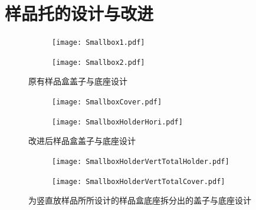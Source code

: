             \section{样品托的设计与改进} %
            \label{sec:样品托的设计与改进}



\begin{figure}[h]
  \centering%
  \begin{subfigure}{0.4\textwidth}
    \texttt{[image: Smallbox1.pdf]}
  \end{subfigure}%
  \begin{subfigure}{0.4\textwidth}
    \texttt{[image: Smallbox2.pdf]}
  \end{subfigure}
  \caption{原有样品盒盖子与底座设计}
  \label{fig:oldSampleBox}
\end{figure}
                  












\begin{figure}[h]
  \centering%
  \begin{subfigure}{0.4\textwidth}
    \texttt{[image: SmallboxCover.pdf]}
  \end{subfigure}%
  \begin{subfigure}{0.4\textwidth}
    \texttt{[image: SmallboxHolderHori.pdf]}
  \end{subfigure}
  \caption{改进后样品盒盖子与底座设计}
  \label{fig:newSampleBox}
\end{figure}











\begin{figure}[h]
  \centering%
  \begin{subfigure}{0.4\textwidth}
    \texttt{[image: SmallboxHolderVertTotalHolder.pdf]}
  \end{subfigure}%
  \begin{subfigure}{0.4\textwidth}
    \texttt{[image: SmallboxHolderVertTotalCover.pdf]}
  \end{subfigure}
  \caption{为竖直放样品所所设计的样品盒底座拆分出的盖子与底座设计}
  \label{fig:newVertiSampleBox}
\end{figure}

